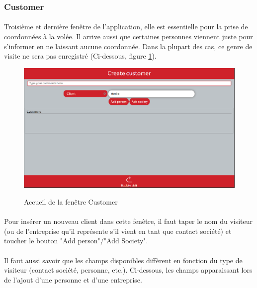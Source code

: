\documentclass[12pt]{report}
\begin{document}
\subsubsection*{Customer}
\paragraph{}
Troisième et dernière fenêtre de l'application, elle est essentielle pour la prise de coordonnées à la volée.
Il arrive aussi que certaines personnes viennent juste pour s'informer en ne laissant aucune coordonnée. Dans la plupart des cas, ce genre de visite ne sera pas enregistré (Ci-dessous, figure \ref{image_customer_3}).

\begin{figure}[H]
	\caption{Accueil de la fenêtre Customer}
	\includegraphics[width=\linewidth]{img/image_customer_3}
	\label{image_customer_3}
\end{figure}

\paragraph{}
Pour insérer un nouveau client dans cette fenêtre, il faut taper le nom du visiteur (ou de l'entreprise qu'il représente s'il vient en tant que contact société) et toucher le bouton "Add person"/"Add Society".
\paragraph{}
Il faut aussi savoir que les champs disponibles diffèrent en fonction du type de visiteur (contact société, personne, etc.).
Ci-dessous, les champs apparaissant lors de l'ajout d'une personne et d'une entreprise.
\end{document}
